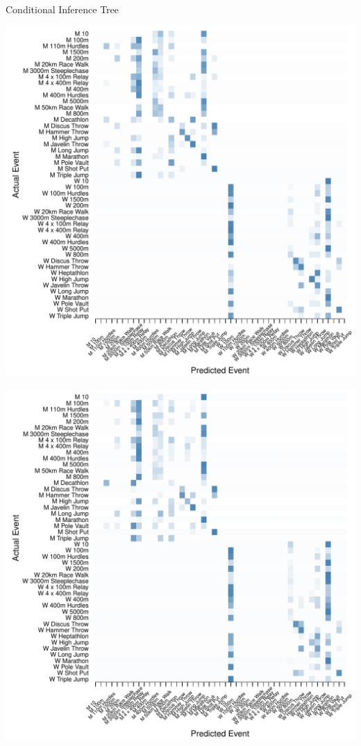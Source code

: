 \documentclass[landscape, paperwidth=42in, paperheight=36in,
fontscale=.35, margin=1in]{baposter}
\begin{document}
\begin{poster}
{    %
\begin{center}
  Conditional Inference Tree \\
  \begin{minipage}{0.45\textwidth}
    \begin{center}
      \includegraphics[scale=0.27]{../graphics/athletesCIT-trn.pdf}
    \end{center}
  \end{minipage}
  \hspace{0.05\textwidth}
  \begin{minipage}{0.45\textwidth}
    \begin{center}
      \includegraphics[scale=0.27]{../graphics/athletesCIT-tst.pdf}

\end{center}
\end{minipage}
\end{center}}
\end{poster}
\end{document}
